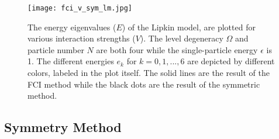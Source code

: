 \documentclass[10pt]{article}
\begin{document}
\begin{figure}[h]
    \centering
    \texttt{[image: fci\_v\_sym\_lm.jpg]}
    \caption{The energy eigenvalues ($E$) of the Lipkin model, are plotted for various interaction strengths ($V$). The level degeneracy $\Omega$ and particle number $N$ are both four while the single-particle energy $\epsilon$ is 1. The different energies $e_k$ for $k=0,1,...,6$ are depicted by different colors, labeled in the plot itself. The solid lines are the result of the FCI method while the black dots are the result of the symmetric method.}
    \label{fig:fci_plot}
\end{figure}

\subsection{Symmetry Method}
\label{subsection:symmetry_method}
\end{document}
